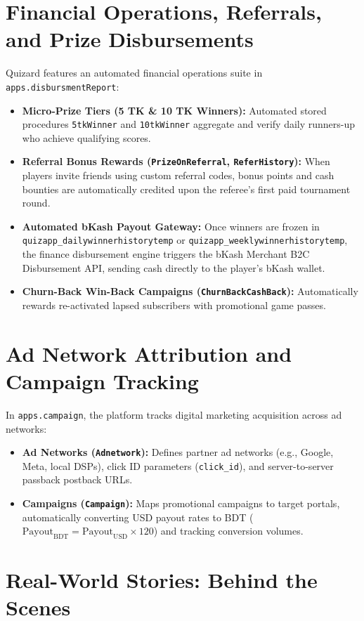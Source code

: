 \section{Financial Operations, Referrals, and Prize Disbursements}
Quizard features an automated financial operations suite in \texttt{apps.disbursmentReport}:

\begin{itemize}
    \item \textbf{Micro-Prize Tiers (5 TK \& 10 TK Winners):} Automated stored procedures \texttt{5tkWinner} and \texttt{10tkWinner} aggregate and verify daily runners-up who achieve qualifying scores.
    \item \textbf{Referral Bonus Rewards (\texttt{PrizeOnReferral}, \texttt{ReferHistory}):} When players invite friends using custom referral codes, bonus points and cash bounties are automatically credited upon the referee's first paid tournament round.
    \item \textbf{Automated bKash Payout Gateway:} Once winners are frozen in \texttt{quizapp\_dailywinnerhistorytemp} or \texttt{quizapp\_weeklywinnerhistorytemp}, the finance disbursement engine triggers the bKash Merchant B2C Disbursement API, sending cash directly to the player's bKash wallet.
    \item \textbf{Churn-Back Win-Back Campaigns (\texttt{ChurnBackCashBack}):} Automatically rewards re-activated lapsed subscribers with promotional game passes.
\end{itemize}

\section{Ad Network Attribution and Campaign Tracking}
In \texttt{apps.campaign}, the platform tracks digital marketing acquisition across ad networks:
\begin{itemize}
    \item \textbf{Ad Networks (\texttt{Adnetwork}):} Defines partner ad networks (e.g., Google, Meta, local DSPs), click ID parameters (\texttt{click\_id}), and server-to-server passback postback URLs.
    \item \textbf{Campaigns (\texttt{Campaign}):} Maps promotional campaigns to target portals, automatically converting USD payout rates to BDT ($\text{Payout}_{\text{BDT}} = \text{Payout}_{\text{USD}} \times 120$) and tracking conversion volumes.
\end{itemize}

\section{Real-World Stories: Behind the Scenes}

